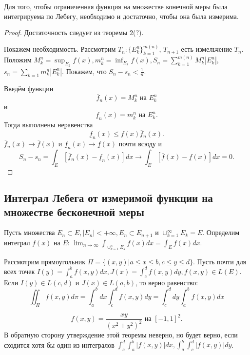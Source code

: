 \documentclass[11pt]{article}
\def\zall{\setcounter{lem}{0}\setcounter{cnsqnc}{0}\setcounter{th}{0}\setcounter{Cmt}{0}\setcounter{equation}{0}\setcounter{stnmt}{0}}
\newcounter{lem}\setcounter{lem}{0}
\newcounter{stnmt}\setcounter{stnmt}{0}
\newcounter{th}\setcounter{th}{0}
\def\th{\par\smallskip\refstepcounter{th}\textbf{\arabic{th}}}
\newtheorem*{Theorem}{Теорема \th}
\newcounter{cnsqnc}\setcounter{cnsqnc}{0}
\newcounter{Cmt}\setcounter{Cmt}{0}
\begin{document}
\begin{Theorem}
Для того, чтобы ограниченная функция на множестве конечной меры была интегрируема по Лебегу,
необходимо и достаточно, чтобы она была измерима.
\end{Theorem}
\begin{proof}
Достаточность следует из теоремы 2(?).

Покажем необходимость. Рассмотрим $T_n: \{E_k^n\}_{k = 1}^{m(n)}$, $T_{n + 1}$ есть измельчение $T_n$.
Положим $M_k^n = \sup_{E_k}f(x), m_k^n = \inf_{E_k}f(x), S_n = \sum_{k = 1}^{m(n)}M_k^n|E_k^n|$,
$s_n = \sum_{k = 1}m_k^n|E_k^n|$. Покажем, что $S_n - s_n < \frac1n$.

Введём функции
\begin{equation}
\overline{f}_n(x) = M_k^n\text{ на }E_k^n
\end{equation}
и
\begin{equation}
\underline{f}_n(x) = m_k^n\text{ на }E_k^n.
\end{equation}
Тогда выполнены неравенства
\begin{equation}
\underline{f}_n(x) \leq f(x) \overline{f}_n(x).
\end{equation}
$\overline{f}_n(x) \to \overline{f}(x)$ и $\underline{f}_n(x) \to \underline{f}(x)$ почти
всюду и
\begin{equation}
S_n - s_n = \int_E[\overline{f}_n(x) - \underline{f}_n(x)]dx \to \int_E[\overline{f}(x) - \underline{f}(x)]dx = 0.
\end{equation}
\end{proof}
\subsection{Интеграл Лебега от измеримой функции на множестве бесконечной меры}
\label{sec:orga5ca2b1}
   \zall
Пусть множества $E_n \subset E, |E_n| < +\infty, E_n \subset E_{n + 1}$ и $\cup_{k = 1}^{\infty}E_k = E$.
Определим интеграл $f(x)$ на $E$: $\lim_{n \to \infty}\int_{\cup_{k = 1}^nE_k}f(x)dx = \int_Ef(x)dx$.
\begin{Theorem}
Рассмотрим прямоугольник $\Pi = \{(x, y) | a \leq x \leq b, c \leq y \leq d\}$. Пусть почти для
всех точек $I(y) = \int_a^bf(x, y)dx, J(x) = \int_c^df(x, y)dy, f(x, y) \in L(E)$. Если
$I(y) \in L(c, d)$ и $J(x) \in L(a, b)$, то верно равенство:
\begin{equation}
\iint_{\Pi}f(x, y)d\pi = \int_a^bdx\int_c^df(x, y)dy = \int_c^ddy\int_a^bf(x, y)dx
\end{equation}
\end{Theorem}
\begin{equation}
f(x, y) = \frac{xy}{(x^2 + y^2)^2} \text{ на } [-1, 1]^2.
\end{equation}
В обратную сторону утверждение этой теоремы неверно, но будет верно, если сходится хотя бы
один из интегралов $\int_c^d\int_a^b|f(x, y)|dx, \int_a^b\int_c^d|f(x, y)|dy$.
\end{document}
